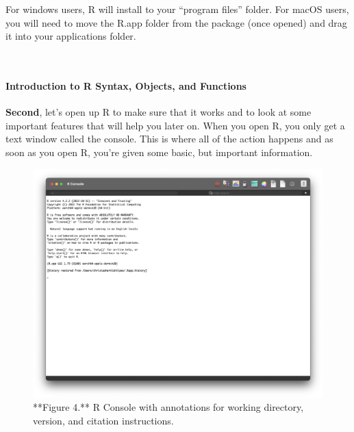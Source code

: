 \documentclass[
]{article}
\begin{document}
\hfill\break

For windows users, R will install to your ``program files'' folder. For
macOS users, you will need to move the R.app folder from the package
(once opened) and drag it into your applications folder.\\
\strut \\

\hypertarget{introduction-to-r-syntax-objects-and-functions}{%
\paragraph{Introduction to R Syntax, Objects, and
Functions}\label{introduction-to-r-syntax-objects-and-functions}}

\textbf{Second}, let's open up R to make sure that it works and to look
at some important features that will help you later on. When you open R,
you only get a text window called the console. This is where all of the
action happens and as soon as you open R, you're given some basic, but
important information.

\begin{figure}

{\centering \includegraphics{images/R_console} 

}

\caption{**Figure 4.** R Console with annotations for working directory, version, and citation instructions.}\label{fig:screenshot of R console running solo}
\end{figure}

\hfill\break
\end{document}
